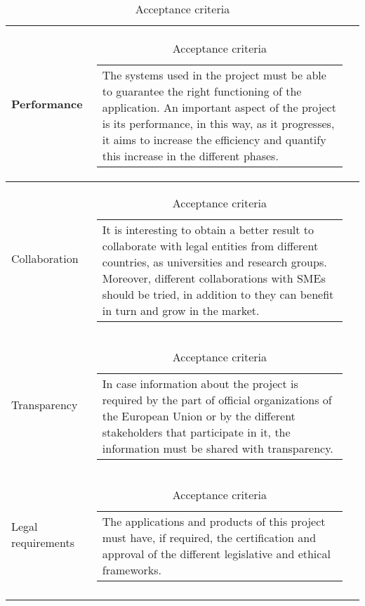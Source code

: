 \begin{longtable}[H]{l c c}
	Performance & \begin{tabular}[c]{@{}l@{}}\begin{minipage}[t]{\linewidth}
			The systems used in the project must be able to guarantee the right functioning of the application. An important aspect of the project is its performance, in this way, as it progresses, it aims to increase the efficiency and quantify this increase in the different phases. \vspace{0.3cm}
	\end{minipage} \end{tabular}                                                                                                                                          \\  \midrule
	Collaboration & \begin{tabular}[c]{@{}l@{}}\begin{minipage}[t]{\linewidth}
			It is interesting to obtain a better result to collaborate with legal entities from different countries, as universities and research groups. Moreover, different collaborations with SMEs should be tried, in addition to they can benefit in turn and grow in the market.  \vspace{0.3cm}
	\end{minipage} \end{tabular}
	\\ \midrule
	Transparency & \begin{tabular}[c]{@{}l@{}}\begin{minipage}[t]{\linewidth}
			In case information about the project is required by the part of official organizations of the European Union or by the different stakeholders that participate in it, the information must be shared with transparency. \vspace{0.3cm}
	\end{minipage} \end{tabular}
	\\ \midrule
	Legal requirements & \begin{tabular}[c]{@{}l@{}}\begin{minipage}[t]{\linewidth}
			The applications and products of this project must have, if required, the certification and approval of the different legislative and ethical frameworks.  \vspace{0.3cm}
	\end{minipage} \end{tabular}                                                                                                                                                                                                                                                                                       \\                                                                   	\bottomrule[2pt]
	\caption{Acceptance criteria}
\end{longtable}
